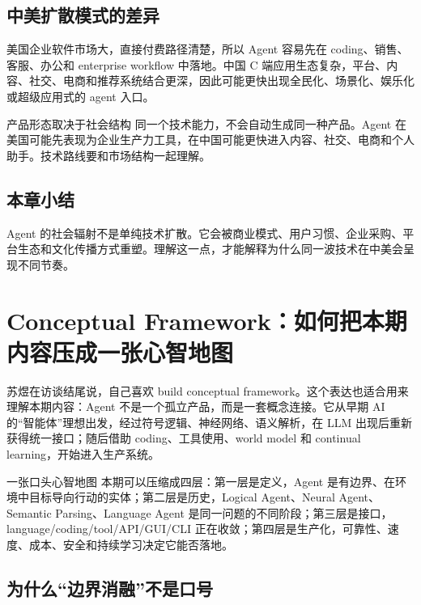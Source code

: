 \documentclass[a4paper]{article}
\begin{document}
\subsection{中美扩散模式的差异}

美国企业软件市场大，直接付费路径清楚，所以 Agent 容易先在 coding、销售、客服、办公和 enterprise workflow 中落地。中国 C 端应用生态复杂，平台、内容、社交、电商和推荐系统结合更深，因此可能更快出现全民化、场景化、娱乐化或超级应用式的 agent 入口。

\begin{importantbox}{产品形态取决于社会结构}
同一个技术能力，不会自动生成同一种产品。Agent 在美国可能先表现为企业生产力工具，在中国可能更快进入内容、社交、电商和个人助手。技术路线要和市场结构一起理解。
\end{importantbox}

\subsection{本章小结}

Agent 的社会辐射不是单纯技术扩散。它会被商业模式、用户习惯、企业采购、平台生态和文化传播方式重塑。理解这一点，才能解释为什么同一波技术在中美会呈现不同节奏。


\section{Conceptual Framework：如何把本期内容压成一张心智地图}

苏煜在访谈结尾说，自己喜欢 build conceptual framework。这个表达也适合用来理解本期内容：Agent 不是一个孤立产品，而是一套概念连接。它从早期 AI 的“智能体”理想出发，经过符号逻辑、神经网络、语义解析，在 LLM 出现后重新获得统一接口；随后借助 coding、工具使用、world model 和 continual learning，开始进入生产系统。

\begin{importantbox}{一张口头心智地图}
本期可以压缩成四层：第一层是定义，Agent 是有边界、在环境中目标导向行动的实体；第二层是历史，Logical Agent、Neural Agent、Semantic Parsing、Language Agent 是同一问题的不同阶段；第三层是接口，language/coding/tool/API/GUI/CLI 正在收敛；第四层是生产化，可靠性、速度、成本、安全和持续学习决定它能否落地。
\end{importantbox}

\subsection{为什么“边界消融”不是口号}
\end{document}
